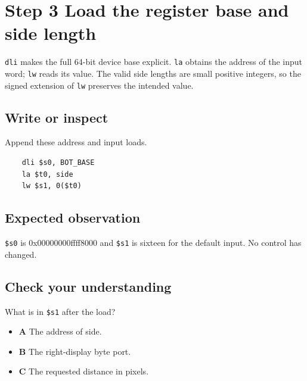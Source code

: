 \section{Step 3 Load the register base and side
  length}\label{006-marsbot-square-s03-step-3-load-the-register-base-and-side-length}

\texttt{dli} makes the full 64-bit device base explicit. \texttt{la}
obtains the address of the input word; \texttt{lw} reads its value. The
valid side lengths are small positive integers, so the signed extension
of \texttt{lw} preserves the intended value.

\subsection{Write or
  inspect}\label{006-marsbot-square-s03-write-or-inspect}

Append these address and input loads.

\begin{verbatim}
    dli $s0, BOT_BASE
    la $t0, side
    lw $s1, 0($t0)
\end{verbatim}

\subsection{Expected
  observation}\label{006-marsbot-square-s03-expected-observation}

\texttt{\$s0} is 0x00000000ffff8000 and \texttt{\$s1} is sixteen for the
default input. No control has changed.

\subsection{Check your
  understanding}\label{006-marsbot-square-s03-check-your-understanding}

What is in \texttt{\$s1} after the load?

\begin{itemize}
  \tightlist
  \item
        \textbf{A} The address of side.
  \item
        \textbf{B} The right-display byte port.
  \item
        \textbf{C} The requested distance in pixels.
\end{itemize}
